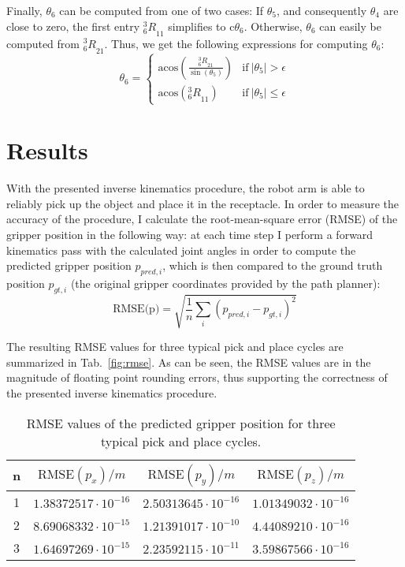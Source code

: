 \documentclass[twoside]{article}
\renewcommand{\c}{\text{c}}
\newcommand{\R}[2]{\mbox{$_{#2}^{#1}{R}$}}
\newcommand{\tabref}[1]{Tab.~\ref{fig:#1}}
\begin{document}
Finally, $\theta_6$ can be computed from one of two cases: If $\theta_5$, and
consequently $\theta_4$ are close to zero, the first entry $\R{3}{6}_{11}$ simplifies to
$\c\theta_6$. Otherwise, $\theta_6$ can easily be computed from $\R{3}{6}_{21}$.
Thus, we get the following expressions for computing $\theta_6$:
\begin{equation}
  \theta_6 =
  \begin{cases}
     \text{acos}\left(\frac{\R{3}{6}_{21}}{\sin(\theta_5)}\right) & \text{if}\ |\theta_5| > \epsilon \\
     \text{acos}\left(\R{3}{6}_{11}\right)                & \text{if}\ |\theta_5| \leq \epsilon
  \end{cases}
\end{equation}

\section{Results}
With the presented inverse kinematics procedure, the robot arm is able to reliably pick up
the object and place it in the receptacle. In order to measure the accuracy of the procedure,
I calculate the root-mean-square error (RMSE) of the gripper position in the following way:
at each time step I perform a forward kinematics pass with the calculated joint angles
in order to compute the predicted gripper position $p_{pred,i}$, which is then compared
to the ground truth position $p_{gt,i}$ (the original gripper coordinates provided by the path planner):
\begin{equation}
  \text{RMSE(p)} = \sqrt{\frac{1}{n}\sum\limits_i(p_{pred,i} - p_{gt,i})^2}
\end{equation}

The resulting RMSE values for three typical pick and place cycles are summarized in
\tabref{rmse}. As can be seen, the RMSE values are in the magnitude of floating point
rounding errors, thus supporting the correctness of the presented inverse kinematics procedure.

\begin{table}[ht]
  \caption{RMSE values of the predicted gripper position for three typical pick and place cycles.}
  \centering\begin{tabular}{c|ccc}
    n & $\text{RMSE}(p_x)/m$ & $\text{RMSE}(p_y)/m$ & $\text{RMSE}(p_z)/m$ \\
    \hline
    1 & $1.38372517 \cdot 10^{−16}$ & $2.50313645 \cdot 10^{−16}$ & $1.01349032 \cdot 10^{−16}$\\
    2 & $8.69068332 \cdot 10^{−15}$ & $1.21391017 \cdot 10^{−10}$ & $4.44089210 \cdot 10^{−16}$\\
    3 & $1.64697269 \cdot 10^{−15}$ & $2.23592115 \cdot 10^{−11}$ & $3.59867566 \cdot 10^{−16}$
  \end{tabular}
\end{table}
\end{document}
